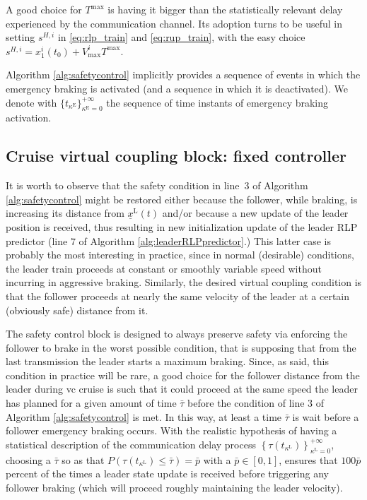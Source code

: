 \documentclass[letterpaper, 10 pt, conference]{ieeeconf}
\theoremstyle{definition}
\theoremstyle{nopoint}
\newcommand{\tildeAdd}{~}
\begin{document}
A good choice for $T^{\max}$ is having it bigger than the statistically relevant delay experienced by the communication channel.
Its adoption turns to be useful in setting $s^{H,i}$ in \eqref{eq:rlp_train} and \eqref{eq:rup_train}, with the easy choice $s^{H,i}=x_1^i(t_0)+V^i_{\max} T^{\max}$.

Algorithm \ref{alg:safetycontrol} implicitly provides a sequence of events in which the emergency braking is activated (and a sequence in which it is deactivated). We denote with 
$\{ t_{\kappa^\mathrm{E}} \}_{\kappa^\mathrm{E} =0}^{+\infty}$ the sequence of time instants of emergency braking activation. 









 
\subsection{Cruise virtual coupling block: fixed controller}
 \label{subsec:vitrualcouplingblock} 
 
It is worth to observe that the safety condition in line\tildeAdd$3$ of  Algorithm \ref{alg:safetycontrol} might be restored either because the follower, while braking, is increasing its distance from $\underline{x}^\mathrm{L}(t)$ and/or because a new update of the leader position is received, thus resulting in new initialization update of the leader RLP predictor (line $7$ of Algorithm \ref{alg:leaderRLPpredictor}.)
This latter case is probably the most interesting in practice, since in normal (desirable) conditions, the leader train proceeds at constant or smoothly variable speed without incurring in aggressive braking. Similarly, the desired virtual coupling condition is that the follower proceeds at nearly the same velocity of the leader at a certain (obviously safe) distance from it. 


The safety control block is designed to always preserve safety via enforcing the follower to brake in the worst possible condition, that is supposing that from the last transmission the leader starts a maximum braking. Since, as said, this condition in practice will be rare, a good choice for the follower distance from the leader during \gls{vc} cruise is such that it could proceed at the same speed the leader has planned for a given amount of time $\bar{\tau}$ before the condition of line  $3$ of  Algorithm \ref{alg:safetycontrol} is met. In this way, at least a time $\bar{\tau}$ is wait before a follower emergency braking occurs. 
With the realistic hypothesis of having a statistical description of the communication delay process $ \left\{ \tau(t_{\kappa^\mathrm{L}})\right\}_{\kappa^\mathrm{L}=0}^{+\infty}$, 
choosing a $\bar{\tau}$ so as that  $P( \tau(t_{\kappa^\mathrm{L}})\leq \bar{\tau})=\bar{p}$ with a $\bar{p}\in [0,1]$, ensures that $100 \bar{p}$ percent of the times a leader state update is received before triggering any follower braking (which will proceed roughly maintaining the leader velocity).
 
\end{document}
